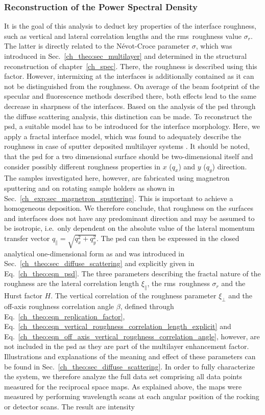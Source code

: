 \subsubsection{Reconstruction of the Power Spectral Density}
It is the goal of this analysis to deduct key properties of the interface roughness, such as vertical and lateral correlation lengths and the \gls{rms}~roughness value $\sigma_r$. The latter is directly related to the N\'{e}vot-Croce parameter $\sigma$, which was introduced in Sec.~\ref{ch_theo:sec_multilayer} and determined in the structural reconstruction of chapter~\ref{ch_spec}. There, the roughness is described using this factor. However, intermixing at the interfaces is additionally contained as it can not be distinguished from the roughness. On average of the beam footprint of the specular and fluorescence methods described there, both effects lead to the same decrease in sharpness of the interfaces. Based on the analysis of the \gls{psd} through the diffuse scattering analysis, this distinction can be made. To reconstruct the \gls{psd}, a suitable model has to be introduced for the interface morphology. Here, we apply a fractal interface model, which was found to adequately describe the roughness in case of sputter deposited multilayer systems \cite{de_boer_x-ray_1995, de_boer_x-ray_1996, sinha_x-ray_1988}. It should be noted, that the \gls{psd} for a two dimensional surface should be two-dimensional itself and consider possibly different roughness properties in $x$ ($q_x$) and $y$ ($q_y$) direction. The samples investigated here, however, are fabricated using magnetron sputtering and on rotating sample holders as shown in Sec.~\ref{ch_exp:sec_magnetron_sputtering}. This is important to achieve a homogeneous deposition. We therefore conclude, that roughness on the surfaces and interfaces does not have any predominant direction and may be assumed to be isotropic, i.e.~only dependent on the absolute value of the lateral momentum transfer vector $q_\parallel = \sqrt{q_x^2+q_y^2}$. The \gls{psd} can then be expressed in the closed analytical one-dimensional form as and was introduced in Sec.~\ref{ch_theo:sec_diffuse_scattering} and explicitly given in Eq.~\eqref{ch_theo:eqn_psd}. The three parameters describing the fractal nature of the roughness are the lateral correlation length $\xi_\parallel$, the \gls{rms}~roughness $\sigma_r$ and the Hurst factor $H$. The vertical correlation of the roughness parameter $\xi_\perp$ and the off-axis roughness correlation angle $\beta$, defined through Eq.~\eqref{ch_theo:eqn_replication_factor}, Eq.~\eqref{ch_theo:eqn_vertical_roughness_correlation_length_explicit} and Eq.~\eqref{ch_theo:eqn_off_axis_vertical_roughness_correlation_angle}, however, are not included in the \gls{psd} as they are part of the multilayer enhancement factor. Illustrations and explanations of the meaning and effect of these parameters can be found in Sec.~\ref{ch_theo:sec_diffuse_scattering}. In order to fully characterize the system, we therefore analyze the full data set comprising all data points measured for the reciprocal space maps. As explained above, the maps were measured by performing wavelength scans at each angular position of the rocking or detector scans. The result are intensity 